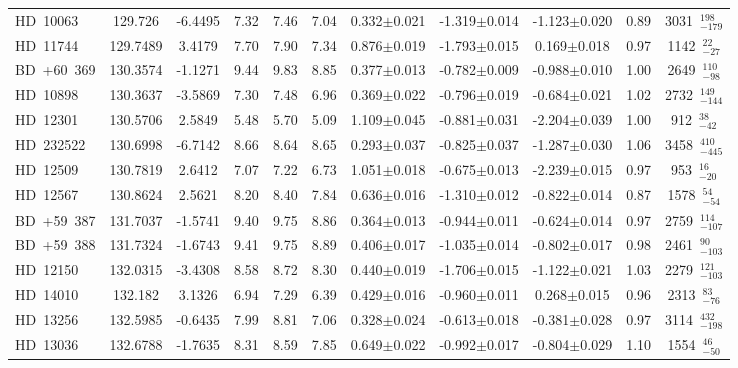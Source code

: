 {\begin{longtable}{lcccccccccc}
HD~10063 & 129.726 & -6.4495 & 7.32 & 7.46 & 7.04 & 0.332$\pm$0.021 & -1.319$\pm$0.014 & -1.123$\pm$0.020 & 0.89 & 3031~$_{-179}^{198}$ \\
\noalign{\smallskip}
HD~11744 & 129.7489 & 3.4179 & 7.70 & 7.90 & 7.34 & 0.876$\pm$0.019 & -1.793$\pm$0.015 & 0.169$\pm$0.018 & 0.97 & 1142~$_{-27}^{22}$ \\
\noalign{\smallskip}
BD~+60~369 & 130.3574 & -1.1271 & 9.44 & 9.83 & 8.85 & 0.377$\pm$0.013 & -0.782$\pm$0.009 & -0.988$\pm$0.010 & 1.00 & 2649~$_{-98}^{110}$ \\
\noalign{\smallskip}
HD~10898 & 130.3637 & -3.5869 & 7.30 & 7.48 & 6.96 & 0.369$\pm$0.022 & -0.796$\pm$0.019 & -0.684$\pm$0.021 & 1.02 & 2732~$_{-144}^{149}$ \\
\noalign{\smallskip}
HD~12301 & 130.5706 & 2.5849 & 5.48 & 5.70 & 5.09 & 1.109$\pm$0.045 & -0.881$\pm$0.031 & -2.204$\pm$0.039 & 1.00 & 912~$_{-42}^{38}$ \\
\noalign{\smallskip}
HD~232522 & 130.6998 & -6.7142 & 8.66 & 8.64 & 8.65 & 0.293$\pm$0.037 & -0.825$\pm$0.037 & -1.287$\pm$0.030 & 1.06 & 3458~$_{-445}^{410}$ \\
\noalign{\smallskip}
HD~12509 & 130.7819 & 2.6412 & 7.07 & 7.22 & 6.73 & 1.051$\pm$0.018 & -0.675$\pm$0.013 & -2.239$\pm$0.015 & 0.97 & 953~$_{-20}^{16}$ \\
\noalign{\smallskip}
HD~12567 & 130.8624 & 2.5621 & 8.20 & 8.40 & 7.84 & 0.636$\pm$0.016 & -1.310$\pm$0.012 & -0.822$\pm$0.014 & 0.87 & 1578~$_{-54}^{54}$ \\
\noalign{\smallskip}
BD~+59~387 & 131.7037 & -1.5741 & 9.40 & 9.75 & 8.86 & 0.364$\pm$0.013 & -0.944$\pm$0.011 & -0.624$\pm$0.014 & 0.97 & 2759~$_{-107}^{114}$ \\
\noalign{\smallskip}
BD~+59~388 & 131.7324 & -1.6743 & 9.41 & 9.75 & 8.89 & 0.406$\pm$0.017 & -1.035$\pm$0.014 & -0.802$\pm$0.017 & 0.98 & 2461~$_{-103}^{90}$ \\
\noalign{\smallskip}
HD~12150 & 132.0315 & -3.4308 & 8.58 & 8.72 & 8.30 & 0.440$\pm$0.019 & -1.706$\pm$0.015 & -1.122$\pm$0.021 & 1.03 & 2279~$_{-103}^{121}$ \\
\noalign{\smallskip}
HD~14010 & 132.182 & 3.1326 & 6.94 & 7.29 & 6.39 & 0.429$\pm$0.016 & -0.960$\pm$0.011 & 0.268$\pm$0.015 & 0.96 & 2313~$_{-76}^{83}$ \\
\noalign{\smallskip}
HD~13256 & 132.5985 & -0.6435 & 7.99 & 8.81 & 7.06 & 0.328$\pm$0.024 & -0.613$\pm$0.018 & -0.381$\pm$0.028 & 0.97 & 3114~$_{-198}^{432}$ \\
\noalign{\smallskip}
HD~13036 & 132.6788 & -1.7635 & 8.31 & 8.59 & 7.85 & 0.649$\pm$0.022 & -0.992$\pm$0.017 & -0.804$\pm$0.029 & 1.10 & 1554~$_{-50}^{46}$ \\

\end{longtable}}
